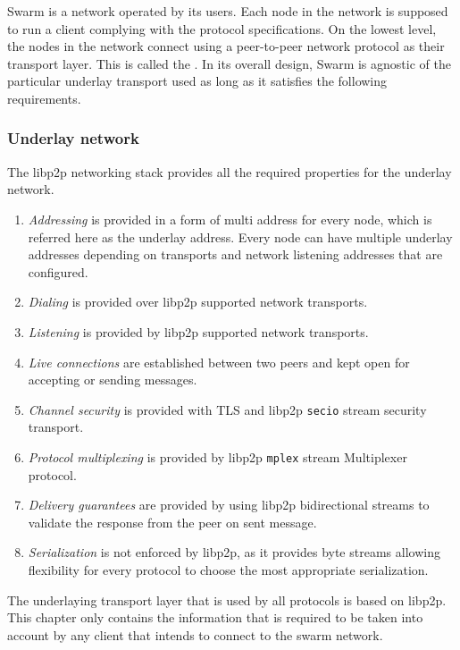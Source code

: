 Swarm is a network operated by its users. Each node in the network is supposed to run a client complying with the protocol specifications. On the lowest level, the nodes in the network connect using a peer-to-peer network protocol as their transport layer. This is called the . 
In its overall design, Swarm is agnostic of the particular underlay transport used as long as it satisfies the following requirements.

\subsubsection{Underlay network \statusyellow}\label{sec:underlay-transport} 

The libp2p networking stack provides all the required properties for the underlay network.
\begin{enumerate}
\def\labelenumi{\arabic{enumi}.}
\tightlist
\item \emph{Addressing} is provided in a form of multi address for every node, which is referred here as the underlay address. Every node can have multiple underlay addresses depending on transports and network listening addresses that are configured.
\item \emph{Dialing} is provided over libp2p supported network transports.
\item \emph{Listening} is provided by libp2p supported network transports.
\item \emph{Live connections} are established between two peers and kept open for accepting or sending messages.
\item \emph{Channel security} is provided with TLS and libp2p \texttt{secio} stream security transport.
\item \emph{Protocol multiplexing} is provided by libp2p \texttt{mplex} stream Multiplexer protocol.
\item \emph{Delivery guarantees} are provided by using libp2p bidirectional streams to validate the response from the peer on sent message.
\item \emph{Serialization} is not enforced by libp2p, as it provides byte streams allowing flexibility for every protocol to choose the most appropriate serialization.
\end{enumerate}

The underlaying transport layer that is used by all protocols is based on libp2p. This chapter only contains the information that is required to be taken into account by any client that intends to connect to the swarm network.

